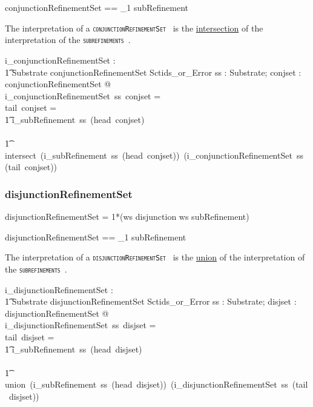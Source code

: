 \documentclass{article}
\def\spec#1{{\tt \small \textsc{{#1}} }}
\def\bnf#1{{\scriptsize {{#1}} }}
\begin{document}
\begin{zed}
conjunctionRefinementSet == \seq_1 subRefinement 
\end{zed}

The interpretation of a \spec{conjunctionRefinementSet} is the \underline{intersection} of the interpretation of the \spec{subrefinements}.

\begin{axdef}
    i\_conjunctionRefinementSet : \\
\t1 Substrate \fun conjunctionRefinementSet \fun Sctids\_or\_Error
\where
   \forall ss : Substrate;  conjset : conjunctionRefinementSet @ \\
   i\_conjunctionRefinementSet~ss~conjset = ~ \\
   \IF tail~conjset = \langle \rangle \THEN \\
   \t1 i\_subRefinement~ss~(head~conjset) \\
\ELSE \\
\t1 intersect~(i\_subRefinement~ss~(head~conjset))~(i\_conjunctionRefinementSet~ss~(tail~conjset))
\end{axdef}

\subsubsection{disjunctionRefinementSet}
\begin{framed}
\noindent
\bnf{disjunctionRefinementSet = 1*(ws disjunction ws subRefinement)}
\end{framed}

\begin{zed}
disjunctionRefinementSet == \seq_1 subRefinement 
\end{zed}

The interpretation of a \spec{disjunctionRefinementSet} is the \underline{union} of the interpretation of the \spec{subrefinements}.

\begin{axdef}
    i\_disjunctionRefinementSet : \\
\t1 Substrate \fun disjunctionRefinementSet \fun Sctids\_or\_Error
\where
   \forall ss : Substrate;  disjset : disjunctionRefinementSet @ \\
   i\_disjunctionRefinementSet~ss~disjset = ~ \\
   \IF tail~disjset =  \langle \rangle \THEN \\
   \t1 i\_subRefinement~ss~(head~disjset) \\
\ELSE \\
\t1 union~(i\_subRefinement~ss~(head~disjset))~(i\_disjunctionRefinementSet~ss~(tail~disjset))
\end{axdef}
\end{document}
